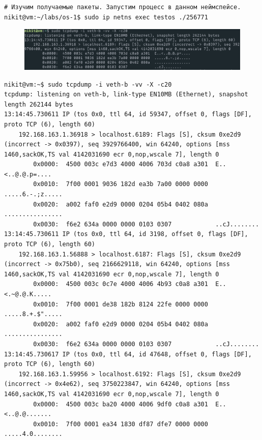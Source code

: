 \documentclass[11pt, a4paper]{article}
\begin{document}
\begin{Verbatim}[fontsize=\small]
  # Изучим получаемые пакеты. Запустим процесс в данном неймспейсе.
nikit@vm:~/labs/os-1$ sudo ip netns exec testos ./256771
\end{Verbatim}


\begin{figure}[h]
  \centering
  \includegraphics[width=\textwidth]{tcpdump.png}
\end{figure}

\begin{Verbatim}[fontsize=\footnotesize]
nikit@vm:~$ sudo tcpdump -i veth-b -vv -X -c20
tcpdump: listening on veth-b, link-type EN10MB (Ethernet), snapshot length 262144 bytes
13:14:45.730611 IP (tos 0x0, ttl 64, id 59347, offset 0, flags [DF], proto TCP (6), length 60)
    192.168.163.1.36918 > localhost.6189: Flags [S], cksum 0xe2d9 (incorrect -> 0x0397), seq 3929766400, win 64240, options [mss 1460,sackOK,TS val 4142031690 ecr 0,nop,wscale 7], length 0
        0x0000:  4500 003c e7d3 4000 4006 703d c0a8 a301  E..<..@.@.p=....
        0x0010:  7f00 0001 9036 182d ea3b 7a00 0000 0000  .....6.-.;z.....
        0x0020:  a002 faf0 e2d9 0000 0204 05b4 0402 080a  ................
        0x0030:  f6e2 634a 0000 0000 0103 0307            ..cJ........
13:14:45.730611 IP (tos 0x0, ttl 64, id 3198, offset 0, flags [DF], proto TCP (6), length 60)
    192.168.163.1.56888 > localhost.6187: Flags [S], cksum 0xe2d9 (incorrect -> 0x75b0), seq 2166629118, win 64240, options [mss 1460,sackOK,TS val 4142031690 ecr 0,nop,wscale 7], length 0
        0x0000:  4500 003c 0c7e 4000 4006 4b93 c0a8 a301  E..<.~@.@.K.....
        0x0010:  7f00 0001 de38 182b 8124 22fe 0000 0000  .....8.+.$".....
        0x0020:  a002 faf0 e2d9 0000 0204 05b4 0402 080a  ................
        0x0030:  f6e2 634a 0000 0000 0103 0307            ..cJ........
13:14:45.730617 IP (tos 0x0, ttl 64, id 47648, offset 0, flags [DF], proto TCP (6), length 60)
    192.168.163.1.59956 > localhost.6192: Flags [S], cksum 0xe2d9 (incorrect -> 0x4e62), seq 3750223847, win 64240, options [mss 1460,sackOK,TS val 4142031690 ecr 0,nop,wscale 7], length 0
        0x0000:  4500 003c ba20 4000 4006 9df0 c0a8 a301  E..<..@.@.......
        0x0010:  7f00 0001 ea34 1830 df87 dfe7 0000 0000  .....4.0........

\end{Verbatim}
\end{document}
